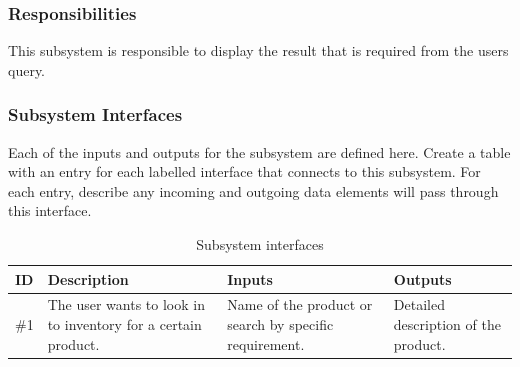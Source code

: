 \subsubsection{Responsibilities}
This subsystem is responsible to display the result that is required from the users query.

\subsubsection{Subsystem Interfaces}
Each of the inputs and outputs for the subsystem are defined here. Create a table with an entry for each labelled interface that connects to this subsystem. For each entry, describe any incoming and outgoing data elements will pass through this interface.

\begin {table}[H]
\caption {Subsystem interfaces} 
\begin{center}
    \begin{tabular}{ | p{1cm} | p{6cm} | p{3cm} | p{3cm} |}
    \hline
    ID & Description & Inputs & Outputs \\ \hline
    \#1 & The user wants to look in to inventory for a certain product.  & Name of the product or search by specific requirement. & Detailed description of the product.  \\ \hline
    \end{tabular}
\end{center}
\end{table}
